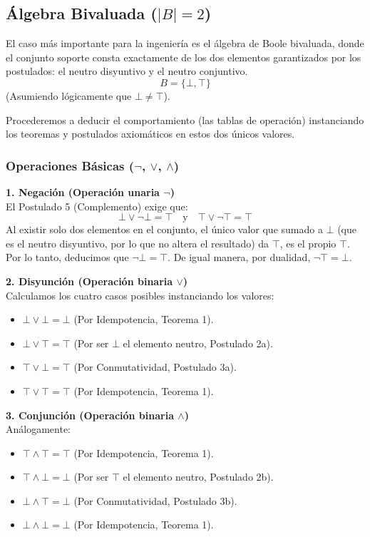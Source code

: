 \subsection{Álgebra Bivaluada ($|B| = 2$)}
El caso más importante para la ingeniería es el álgebra de Boole bivaluada, donde el conjunto soporte consta exactamente de los dos elementos garantizados por los postulados: el neutro disyuntivo y el neutro conjuntivo. 
\[ B = \{ \bot, \top \} \]
(Asumiendo lógicamente que $\bot \neq \top$).

Procederemos a deducir el comportamiento (las tablas de operación) instanciando los teoremas y postulados axiomáticos en estos dos únicos valores.

\subsubsection{Operaciones Básicas ($\neg$, $\vee$, $\wedge$)}

\textbf{1. Negación (Operación unaria $\neg$)} \\
El Postulado 5 (Complemento) exige que:
\[ \bot \vee \neg \bot = \top \quad \text{y} \quad \top \vee \neg \top = \top \]
Al existir solo dos elementos en el conjunto, el único valor que sumado a $\bot$ (que es el neutro disyuntivo, por lo que no altera el resultado) da $\top$, es el propio $\top$. Por lo tanto, deducimos que $\neg \bot = \top$. De igual manera, por dualidad, $\neg \top = \bot$.

\textbf{2. Disyunción (Operación binaria $\vee$)} \\
Calculamos los cuatro casos posibles instanciando los valores:
\begin{itemize}
    \item $\bot \vee \bot = \bot$ (Por Idempotencia, Teorema 1).
    \item $\bot \vee \top = \top$ (Por ser $\bot$ el elemento neutro, Postulado 2a).
    \item $\top \vee \bot = \top$ (Por Conmutatividad, Postulado 3a).
    \item $\top \vee \top = \top$ (Por Idempotencia, Teorema 1).
\end{itemize}

\textbf{3. Conjunción (Operación binaria $\wedge$)} \\
Análogamente:
\begin{itemize}
    \item $\top \wedge \top = \top$ (Por Idempotencia, Teorema 1).
    \item $\top \wedge \bot = \bot$ (Por ser $\top$ el elemento neutro, Postulado 2b).
    \item $\bot \wedge \top = \bot$ (Por Conmutatividad, Postulado 3b).
    \item $\bot \wedge \bot = \bot$ (Por Idempotencia, Teorema 1).
\end{itemize}

